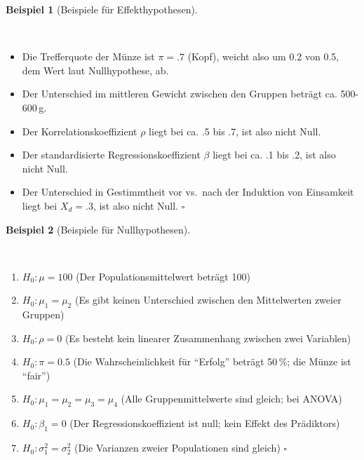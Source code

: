 \documentclass[
  ngerman,
  letterpaper,
  twoside,
  open=any]{scrbook}
\providecommand{\tightlist}{%
  \setlength{\itemsep}{0pt}\setlength{\parskip}{0pt}}\usepackage{longtable,booktabs,array}
\theoremstyle{definition}
\newtheorem{example}{Beispiel}[chapter]
\theoremstyle{plain}
\theoremstyle{definition}
\theoremstyle{definition}
\theoremstyle{definition}
\newtheorem{example}{Beispiel}[chapter]
\theoremstyle{definition}
\theoremstyle{remark}
\begin{document}
\begin{example}[Beispiele für
Effekthypothesen]\protect\hypertarget{exm-effekt}{}\label{exm-effekt}

~

\begin{itemize}
\tightlist
\item
  Die Trefferquote der Münze ist \(\pi = .7\) (Kopf), weicht also um 0.2
  von 0.5, dem Wert laut Nullhypothese, ab.
\item
  Der Unterschied im mittleren Gewicht zwischen den Gruppen beträgt ca.
  500-600\,g.
\item
  Der Korrelationskoeffizient \(\rho\) liegt bei ca. .5 bis .7, ist also
  nicht Null.
\item
  Der standardisierte Regressionskoeffizient \(\beta\) liegt bei ca. .1
  bis .2, ist also nicht Null.
\item
  Der Unterschied in Gestimmtheit vor vs.~nach der Induktion von
  Einsamkeit liegt bei \(X_d = .3\), ist also nicht Null. \(\square\)
\end{itemize}

\end{example}

\begin{example}[Beispiele für
Nullhypothesen]\protect\hypertarget{exm-nullhyp}{}\label{exm-nullhyp}

~

\begin{enumerate}
\def\labelenumi{\Alph{enumi})}
\tightlist
\item
  \(H_0: \mu = 100\) (Der Populationsmittelwert beträgt 100)
\item
  \(H_0: \mu_1 = \mu_2\) (Es gibt keinen Unterschied zwischen den
  Mittelwerten zweier Gruppen)
\item
  \(H_0: \rho = 0\) (Es besteht kein linearer Zusammenhang zwischen zwei
  Variablen)
\item
  \(H_0: \pi = 0.5\) (Die Wahrscheinlichkeit für \enquote{Erfolg}
  beträgt 50\,\%; die Münze ist \enquote{fair})
\item
  \(H_0: \mu_1 = \mu_2 = \mu_3 = \mu_4\) (Alle Gruppenmittelwerte sind
  gleich; bei ANOVA)
\item
  \(H_0: \beta_1 = 0\) (Der Regressionskoeffizient ist null; kein Effekt
  des Prädiktors)
\item
  \(H_0: \sigma_1^2 = \sigma_2^2\) (Die Varianzen zweier Populationen
  sind gleich) \(\square\)
\end{enumerate}

\end{example}
\end{document}
